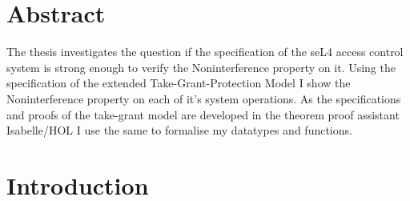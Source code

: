 \documentclass[11pt,a4paper,twoside]{article}
\begin{document}
	
	\deckblatt
	
	\declaration
	
	\clearpage
	\section*{Abstract}
	
	 The thesis investigates the question if the specification of the seL4 access control system is strong enough to verify the Noninterference property on it. 
Using the specification of the extended Take-Grant-Protection Model \cite{TakeG} I show the Noninterference property \cite{InfFlow} on each of it's system operations. 
As the specifications and proofs of the take-grant model are developed in the theorem proof assistant Isabelle/HOL I use the same to formalise my datatypes and functions. 
	

	\newpage
	\listoffigures
	\newpage
	\tableofcontents

	
	\clearpage
	\section{Introduction}
\end{document}
